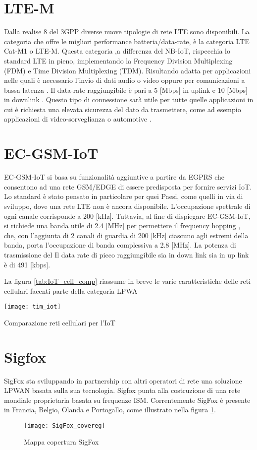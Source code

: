 \section{LTE-M}
Dalla realise 8 del 3GPP diverse nuove tipologie di rete LTE sono disponibili.
La categoria che offre le migliori performance batteria/data-rate, è la categoria
LTE Cat-M1 o LTE-M.
Questa categoria ,a differenza del NB-IoT, rispecchia lo standard LTE in pieno, 
implementando  la Frequency Division Multiplexing
(FDM) e Time Division Multiplexing (TDM). Risultando adatta per applicazioni
nelle quali è necessario l'invio di dati audio o video oppure per comunicazioni a
bassa latenza . Il data-rate raggiungibile è pari a 5 [Mbps] in
uplink e 10 [Mbps] in downlink .  Questo tipo di connessione sarà utile
per tutte quelle applicazioni in cui è richiesta una elevata sicurezza del dato
da trasmettere, come ad esempio applicazioni di video-sorveglianza o automotive
.

\section{EC-GSM-IoT}
EC-GSM-IoT si basa su funzionalità aggiuntive a partire da EGPRS che consentono
ad una rete GSM/EDGE di essere predisposta per fornire servizi IoT. Lo standard
è stato pensato in particolare per quei Paesi, come quelli in via di sviluppo,
dove una rete LTE non è ancora disponibile. L’occupazione spettrale di ogni
canale corrisponde a  200 [kHz].  Tuttavia, al fine di dispiegare EC-GSM-IoT, si
richiede una banda utile di 2.4 [MHz] per permettere il frequency hopping , che,
con l’aggiunta di 2 canali di guardia di 200 [kHz] ciascuno agli estremi della
banda, porta l’occupazione di banda complessiva a 2.8 [MHz].  La
potenza di trasmissione del Il data rate di picco raggiungibile sia in down link sia in
up link è di 491 [kbps].

La figura \ref{tab:IoT_cell_comp} riassume in breve le varie caratteristiche
delle reti cellulari facenti parte della categoria LPWA
\begin{table}[h]
    \centering 
                \texttt{[image: tim\_iot]}
    \caption{Comparazione reti cellulari per l'IoT}
    \label{tab:IoT_cell_comp} 
\end{table}



\section{Sigfox}
SigFox sta sviluppando in partnership con altri operatori di
rete una soluzione LPWAN basata sulla sua tecnologia. Sigfox punta alla
costruzione di una rete mondiale proprietaria basata su frequenze ISM.
Correntemente SigFox è presente in Francia, Belgio, Olanda e Portogallo, come
illustrato nella figura \ref{fig:Sig_covereg}.
\begin{figure}[h]
    \centering 
                \texttt{[image: SigFox\_covereg]}
    \caption{Mappa copertura SigFox}
    \label{fig:Sig_covereg} 
\end{figure}

